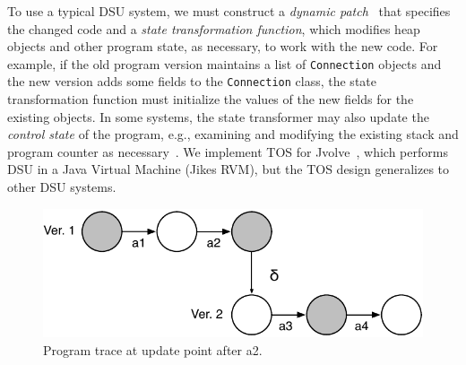 \documentclass[natbib,10pt]{sigplanconf}
\newcommand{\code}[1]{\lstinline|#1|\xspace}
\newcommand{\TOS}{TOS\xspace}
\begin{document}
To use a typical DSU system, we
must construct a \emph{dynamic patch}~\cite{HicksNettles03} that
specifies the changed code and a \emph{state transformation function},
which modifies heap objects and other program state, as necessary, to
work with the new code.  For example, if the old program version
maintains a list of \code{Connection} objects and the new version adds
some fields to the \code{Connection} class, the state transformation
function must initialize the values of the new fields for the existing
objects.  In some systems, the state transformer may also update the
\emph{control state} of the program, e.g., examining and modifying the
existing stack and program counter as necessary~\cite{upstare,jvolve}.
We implement \TOS for Jvolve~\cite{jvolve}, which performs DSU in a
Java Virtual Machine (Jikes RVM), but the \TOS design
generalizes to other DSU systems.

\begin{figure}
\begin{center}
\includegraphics[scale=0.55]{updated-program-trace}
\end{center}
\caption{\label{fig:hybrid}Program trace at update point
  after a2.}
\end{figure}
\end{document}
